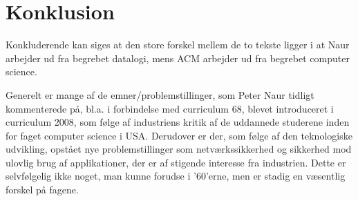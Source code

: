 \documentclass[10pt,a4paper]{article}
\begin{document}
\section{Konklusion}
Konkluderende kan siges at den store forskel mellem de to tekste ligger i at
Naur arbejder ud fra begrebet datalogi, mens ACM arbejder ud fra begrebet
computer science. %

Generelt er mange af de emner/problemstillinger, som Peter Naur tidligt
kommenterede på, bl.a. i forbindelse med curriculum 68, blevet introduceret i curriculum 2008, som følge af industriens
kritik af de uddannede studerene inden for faget computer science i USA.
Derudover er der, som følge af den teknologiske udvikling, opstået nye
problemstillinger som netværkssikkerhed og sikkerhed mod ulovlig brug af
applikationer, der er af stigende interesse fra industrien. Dette er
selvfølgelig ikke noget, man kunne forudse i '60'erne, men er stadig en
væsentlig forskel på fagene.
\end{document}
